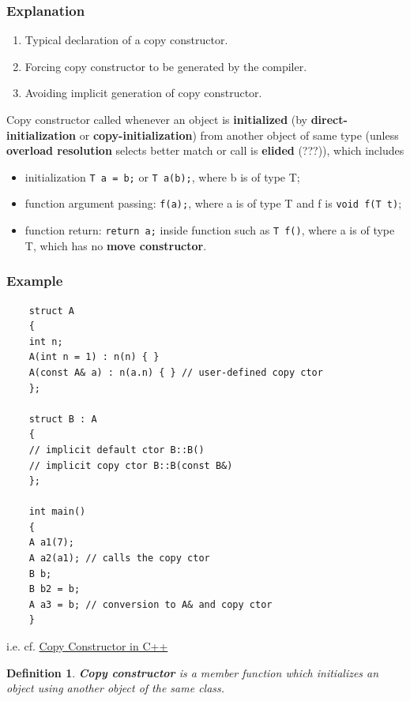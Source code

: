 \documentclass[10pt]{amsart}
\newtheorem{definition}{Definition}
\begin{document}
\subsubsection{Explanation}  
\begin{enumerate}
	\item Typical declaration of a copy constructor.  
	\item Forcing copy constructor to be generated by the compiler.  
	\item Avoiding implicit generation of copy constructor.  
\end{enumerate}


Copy constructor called whenever an object is \textbf{initialized} (by \textbf{direct-initialization} or \textbf{copy-initialization}) from another object of same type (unless \textbf{overload resolution} selects better match or call is \textbf{elided} (???)), which includes  
\begin{itemize}
	\item initialization \verb|T a = b;| or \verb|T a(b);|, where b is of type T;  
	\item function argument passing: \verb|f(a);|, where a is of type T and f is \verb|void f(T t)|;  
	\item function return: \verb|return a;| inside function such as \verb|T f()|, where a is of type T, which has no \textbf{move constructor}.   
\end{itemize}

\subsubsection{Example}  
	
	\begin{lstlisting}
	struct A
	{
	int n;
	A(int n = 1) : n(n) { }
	A(const A& a) : n(a.n) { } // user-defined copy ctor
	};
	
	struct B : A
	{
	// implicit default ctor B::B()
	// implicit copy ctor B::B(const B&)
	};
	
	int main()
	{
	A a1(7);
	A a2(a1); // calls the copy ctor
	B b;
	B b2 = b;
	A a3 = b; // conversion to A& and copy ctor  
	}
	\end{lstlisting}  

i.e. cf. \href{http://www.geeksforgeeks.org/copy-constructor-in-cpp/}{Copy Constructor in C++}

\begin{definition}
	\textbf{Copy constructor} is a member function which initializes an object using another object of the same class.  
\end{definition}
\end{document}
